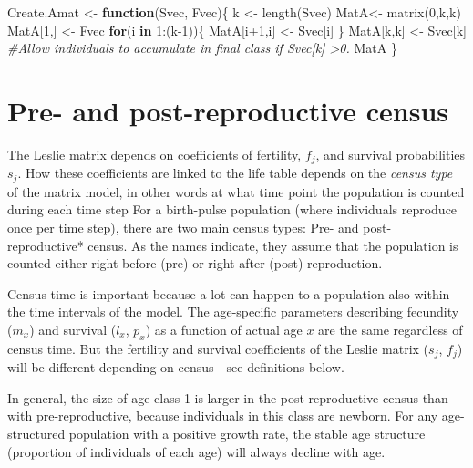 \documentclass[
]{book}
\newenvironment{Shaded}{\begin{snugshade}}{\end{snugshade}}
\newcommand{\CommentTok}[1]{\textcolor[rgb]{0.56,0.35,0.01}{\textit{#1}}}
\newcommand{\ControlFlowTok}[1]{\textcolor[rgb]{0.13,0.29,0.53}{\textbf{#1}}}
\newcommand{\DecValTok}[1]{\textcolor[rgb]{0.00,0.00,0.81}{#1}}
\newcommand{\FunctionTok}[1]{\textcolor[rgb]{0.00,0.00,0.00}{#1}}
\newcommand{\NormalTok}[1]{#1}
\newcommand{\OtherTok}[1]{\textcolor[rgb]{0.56,0.35,0.01}{#1}}
\newcommand{\SpecialCharTok}[1]{\textcolor[rgb]{0.00,0.00,0.00}{#1}}
\begin{document}
\begin{Shaded}
\begin{Highlighting}[]
\NormalTok{Create.Amat }\OtherTok{\textless{}{-}} \ControlFlowTok{function}\NormalTok{(Svec, Fvec)\{}
\NormalTok{  k }\OtherTok{\textless{}{-}} \FunctionTok{length}\NormalTok{(Svec)}
\NormalTok{  MatA}\OtherTok{\textless{}{-}} \FunctionTok{matrix}\NormalTok{(}\DecValTok{0}\NormalTok{,k,k)}
\NormalTok{  MatA[}\DecValTok{1}\NormalTok{,] }\OtherTok{\textless{}{-}}\NormalTok{ Fvec }
  \ControlFlowTok{for}\NormalTok{(i }\ControlFlowTok{in} \DecValTok{1}\SpecialCharTok{:}\NormalTok{(k}\DecValTok{{-}1}\NormalTok{))\{}
\NormalTok{    MatA[i}\SpecialCharTok{+}\DecValTok{1}\NormalTok{,i] }\OtherTok{\textless{}{-}}\NormalTok{ Svec[i]}
\NormalTok{  \}}
\NormalTok{  MatA[k,k] }\OtherTok{\textless{}{-}}\NormalTok{ Svec[k] }\CommentTok{\#Allow individuals to accumulate in final class if Svec[k] \textgreater{}0.}
\NormalTok{  MatA}
\NormalTok{  \}}
\end{Highlighting}
\end{Shaded}

\hypertarget{census}{%
\section{Pre- and post-reproductive census}\label{census}}

The Leslie matrix depends on coefficients of fertility, \(f_j\), and survival probabilities \(s_j\). How these coefficients are linked to the life table depends on the \emph{census type} of the matrix model, in other words at what time point the population is counted during each time step For a birth-pulse population (where individuals reproduce once per time step), there are two main census types: Pre- and post-reproductive* census. As the names indicate, they assume that the population is counted either right before (pre) or right after (post) reproduction.

Census time is important because a lot can happen to a population also within the time intervals of the model. The age-specific parameters describing fecundity (\(m_x\)) and survival (\(l_x\), \(p_x\)) as a function of actual age \(x\) are the same regardless of census time. But the fertility and survival coefficients of the Leslie matrix (\(s_j\), \(f_j\)) will be different depending on census - see definitions below.

In general, the size of age class 1 is larger in the post-reproductive census than with pre-reproductive, because individuals in this class are newborn. For any age-structured population with a positive growth rate, the stable age structure (proportion of individuals of each age) will always decline with age.
\end{document}
